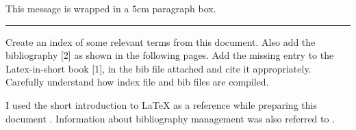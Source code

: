 \documentclass[12pt,a4paper]{article}
\begin{document}
	\parbox{5cm}{
		This message is wrapped in a 5cm paragraph box.
	}
	
	\vspace{0.3cm}
	
	\noindent
	\rule{0.5em}{1em}
	
	\vspace{0.1cm}
	
	\noindent
	
	
	\vspace{0.5cm}
	
	Create an index of some relevant terms from this document.
	Also add the bibliography [2] as shown in the following
	pages. Add the missing entry to the Latex-in-short book
	[1], in the bib file attached and cite it appropriately.
	Carefully understand how index file and bib files are
	compiled.
	
	I used the short introduction to \LaTeX{} as a reference
	while preparing this document \cite{lshort}. Information
	about bibliography management was also referred to
	\cite{overleaf}.
	
	\clearpage
	
	\printindex
	
	\clearpage
	
	\printbibliography[title={References}]
	
\end{document}
